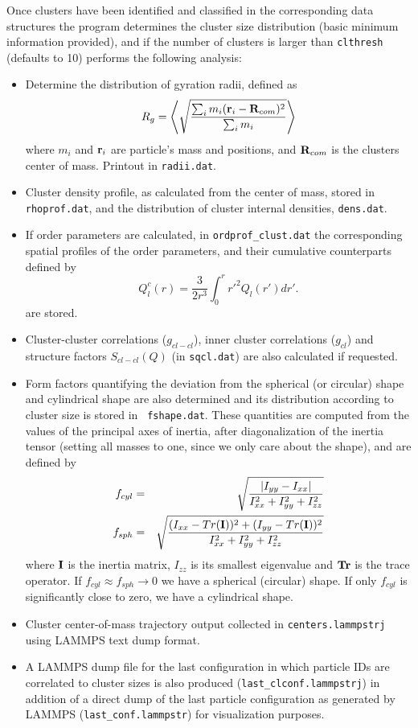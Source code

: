\documentclass[final,1p,times]{elsarticle}
\begin{document}
Once clusters have been identified and classified in the corresponding
data structures the program determines the cluster size distribution
(basic minimum information provided), and if the number of clusters is
larger than {\tt clthresh} (defaults to 10) performs the following
analysis: 
\begin{itemize}
  \item Determine the distribution of gyration radii, defined as 
\begin{equation}
R_g = \left<\sqrt{\frac{\sum_i m_i ({\bf r}_i-{\bf R}_{com})^2}{\sum_i m_i}}\right>
\label{Rg}
\end{equation}
where $m_i$ and ${\bf r}_i$ are particle's mass and positions, and ${\bf R}_{com}$ is the clusters center of mass. Printout in {\tt radii.dat}.
  \item Cluster density profile, as calculated from the center of mass, stored in {\tt rhoprof.dat}, and the distribution of cluster internal densities, {\tt dens.dat}.
  \item If order parameters are calculated, in {\tt ordprof\_clust.dat} the corresponding spatial profiles of the order parameters, and their cumulative counterparts defined by 
\begin{equation}
Q_l^c(r) = \frac{3}{2r^3}\int_0^r {r'}^2Q_l(r') dr'.
\label{phi6c}
\end{equation}
are stored. 
\item Cluster-cluster correlations ($g_{cl-cl}$), inner cluster correlations ($g_{cl}$) and structure factors $S_{cl-cl}(Q)$ (in {\tt sqcl.dat}) are also calculated if requested.
\item Form factors quantifying the deviation from the spherical (or
  circular) shape and cylindrical shape are also determined and its
  distribution according to cluster size is stored in {\tt
    fshape.dat}. These quantities are computed from the values of the
  principal axes of inertia, after diagonalization of the inertia
  tensor (setting all masses to one, since we only care about the
  shape), and are defined by 
\begin{eqnarray}
f_{cyl} & = & \sqrt{\frac{|I_{yy}-I_{xx}|}{I_{xx}^2+I_{yy}^2+I_{zz}^2}}
  \\
f_{sph} & = & \sqrt{\frac{(I_{xx}-{\mbox\bf Tr}({\bf
              I}))^2+(I_{yy}-{\mbox\bf Tr}({\bf
              I}))^2}{I_{xx}^2+I_{yy}^2+I_{zz}^2}}
\end{eqnarray}
where ${\bf I}$ is the inertia matrix, $I_{zz}$ is its smallest
eigenvalue and $\mbox{\bf Tr}$ is the trace operator. If
$f_{cyl}\approx f_{sph}\rightarrow 0$ we have a spherical (circular)
shape. If only $f_{cyl}$ is significantly close to zero, we have a
cylindrical shape. 

\item Cluster center-of-mass trajectory output collected in {\tt centers.lammpstrj} using LAMMPS text dump format.
\item A LAMMPS dump file for the last configuration in which particle IDs are correlated to cluster sizes is also produced ({\tt last\_clconf.lammpstrj}) in addition of a direct dump of the last particle configuration as generated by LAMMPS ({\tt last\_conf.lammpstr}) for visualization purposes.
\end{itemize}
\end{document}
